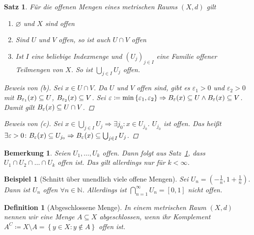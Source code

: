 \documentclass[11pt, twoside, a4paper]{article}
\theoremstyle{plain}
\newtheorem{bemerkung}[blockelement]{Bemerkung}
\newtheorem{definition}[blockelement]{Definition}
\newtheorem{satz}[blockelement]{Satz}
\newtheorem{beispiel}[blockelement]{Beispiel}
\numberwithin{equation}{subsection}
\newcommand{\set}[1]{\left\{#1\right\}}
\newcommand{\pair}[1]{\left(#1\right)}
\newcommand{\of}[1]{\mathopen{}\mathclose{}\bgroup\left(#1\aftergroup\egroup\right)}
\newcommand{\interv}[1]{\left[#1\right]}
\newcommand{\impl}[0]{\Rightarrow{}}
\newcommand{\exclude}[0]{\setminus}
\renewcommand{\emptyset}{\varnothing}
\newcommand{\N}{\mathbb{N}}
\begin{document}
    \begin{satz} %
        \label{satz:offene-mengen-metr}
        Für die offenen Mengen eines metrischen Raums $\pair{X, d}$ gilt
        \begin{enumerate}[label=(\alph*)]
            \item $\emptyset$ und $X$ sind offen
            \item Sind $U$ und $V$ offen, so ist auch $U\cap V$ offen
            \item Ist $I$ eine beliebige Indexmenge und $(U_j)_{j\in I}$ eine Familie offener Teilmengen von $X$. So ist $\bigcup_{j\in I} U_j$ offen.
        \end{enumerate}

        \begin{proof}[Beweis von (b)]
            Sei $x\in U\cap V$. Da $U$ und $V$ offen sind, gibt es $\varepsilon_1 > 0$ und $\varepsilon_2 > 0$ mit $B_{\varepsilon_1}\of{x}\subseteq U$, $B_{\varepsilon_2}\of{x}\subseteq V$. Sei $\varepsilon\coloneqq \min\set{\varepsilon_1, \varepsilon_2} \impl B_{\varepsilon}\of{x}\subseteq U\land B_{\varepsilon}\of{x}\subseteq V$. Damit gilt $B_{\varepsilon}\of{x}\subseteq U\cap V$.
        \end{proof}

        \begin{proof}[Beweis von (c)]
            Sei $x\in \bigcup_{j\in I} U_j \impl \exists j_0\colon x\in U_{j_0}$. $U_{j_0}$ ist offen. Das heißt $\exists\varepsilon > 0\colon B_{\varepsilon}\of{x}\subseteq U_{j_0} \impl B_{\varepsilon}\of{x}\subseteq \bigcup_{j\in I} U_{j}$.
        \end{proof}
    \end{satz}

    \begin{bemerkung}
        Seien $U_1, \ldots, U_k$ offen. Dann folgt aus Satz~\ref{satz:offene-mengen-metr}, dass $U_1\cap U_2\cap\dots\cap U_k$ offen ist. Das gilt allerdings nur für $k < \infty$.
    \end{bemerkung}

    \begin{beispiel}[Schnitt über unendlich viele offene Mengen]
        Sei $U_n = \pair{-\frac{1}{n}, 1+\frac{1}{n}}$. Dann ist $U_n$ offen $\forall n\in\N$. Allerdings ist $\bigcap_{n=1}^{\infty} U_n = \interv{0, 1}$ nicht offen.
    \end{beispiel}

    \begin{definition}[Abgeschlossene Menge]
        In einem metrischen Raum $\pair{X, d}$ nennen wir eine Menge $A\subseteq X$ abgeschlossen, wenn ihr Komplement $A^{C}\coloneqq X \exclude A = \set{y\in X: y\not\in A}$ offen ist.
    \end{definition}
\end{document}

